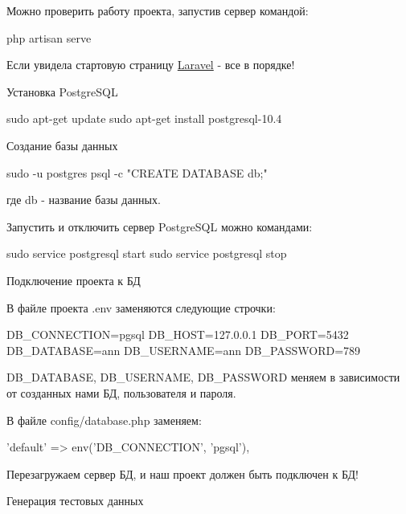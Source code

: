 Можно проверить работу проекта, запустив сервер командой\+: \begin{DoxyVerb}php artisan serve
\end{DoxyVerb}


Если увидела стартовую страницу \hyperlink{namespaceLaravel}{Laravel} -\/ все в порядке!


\begin{DoxyItemize}
\item Установка Postgre\+S\+QL 
\begin{DoxyCode}
sudo apt-get update
sudo apt-get install postgresql-10.4
\end{DoxyCode}

\item Создание базы данных 
\begin{DoxyCode}
sudo -u postgres psql -c "CREATE DATABASE db;"
\end{DoxyCode}
 где db -\/ название базы данных.
\end{DoxyItemize}

Запустить и отключить сервер Postgre\+S\+QL можно командами\+: \begin{DoxyVerb}sudo service postgresql start
sudo service postgresql stop
\end{DoxyVerb}



\begin{DoxyItemize}
\item Подключение проекта к БД
\end{DoxyItemize}

В файле проекта .env заменяются следующие строчки\+: \begin{DoxyVerb}DB_CONNECTION=pgsql
DB_HOST=127.0.0.1
DB_PORT=5432
DB_DATABASE=ann
DB_USERNAME=ann
DB_PASSWORD=789
\end{DoxyVerb}


D\+B\+\_\+\+D\+A\+T\+A\+B\+A\+SE, D\+B\+\_\+\+U\+S\+E\+R\+N\+A\+ME, D\+B\+\_\+\+P\+A\+S\+S\+W\+O\+RD меняем в зависимости от созданных нами БД, пользователя и пароля.

В файле config/database.\+php заменяем\+: \begin{DoxyVerb}'default' => env('DB_CONNECTION', 'pgsql'),
\end{DoxyVerb}


Перезагружаем сервер БД, и наш проект должен быть подключен к БД!


\begin{DoxyItemize}
\item Генерация тестовых данных
\end{DoxyItemize}

